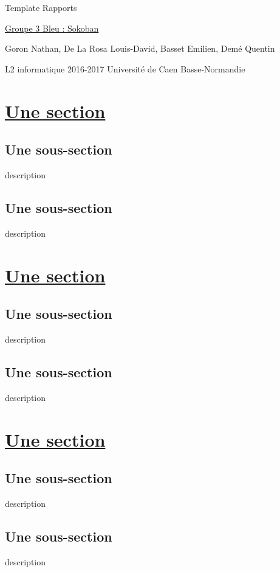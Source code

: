 \documentclass{article}
\begin{document}
\begin{titlepage}
\begin{center}
\Huge Template Rapports

\normalsize
\vspace{0.5cm}
\Large {\underline{ Groupe 3 Bleu : Sokoban} }

\vspace{1cm}
\normalsize
Goron Nathan, De La Rosa Louis-David, Basset Emilien, Demé Quentin

\vspace{14.5cm}
L2 informatique 2016-2017 Université de Caen Basse-Normandie
\end{center}
\end{titlepage}


\newpage


\section{\underline{Une section}}
	\subsection{Une sous-section}
	description
	\subsection{Une sous-section}
	description
\vspace{1cm}
\section{\underline{Une section}}
	\subsection{Une sous-section}
	description
	\subsection{Une sous-section}
	description
\vspace{1cm}
\section{\underline{Une section}}
	\subsection{Une sous-section}
	description
	\subsection{Une sous-section}
	description
		

\newpage
\end{document}
